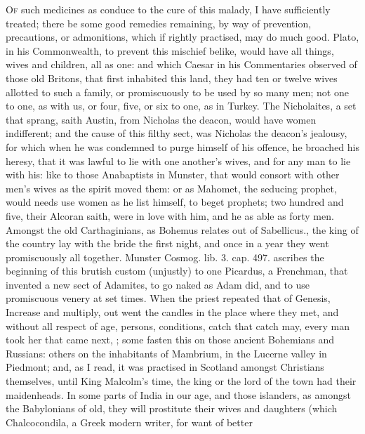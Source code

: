 \lettrine{O}{f} such medicines as conduce to the cure of this malady, I have
sufficiently treated; there be some good remedies remaining, by way of
prevention, precautions, or admonitions, which if rightly practised,
may do much good. Plato, in his Commonwealth, to prevent this mischief
belike, would have all things, wives and children, all as one: and
which Caesar in his Commentaries observed of those old Britons, that
first inhabited this land, they had ten or twelve wives allotted to
such a family, or promiscuously to be used by so many men; not one to
one, as with us, or four, five, or six to one, as in Turkey. The
Nicholaites, a set that sprang, saith Austin, from Nicholas the
deacon, would have women indifferent; and the cause of this filthy
sect, was Nicholas the deacon's jealousy, for which when he was
condemned to purge himself of his offence, he broached his heresy, that
it was lawful to lie with one another's wives, and for any man to lie
with his: like to those Anabaptists in Munster, that would
consort with other men's wives as the spirit moved them: or as
Mahomet, the seducing prophet, would needs use women as he list
himself, to beget prophets; two hundred and five, their Alcoran saith,
were in love with him, and he as able as forty men. Amongst the
old Carthaginians, as Bohemus relates out of Sabellicus., the
king of the country lay with the bride the first night, and once in a
year they went promiscuously all together. Munster Cosmog. lib. 3. cap.
497. ascribes the beginning of this brutish custom (unjustly) to one
Picardus, a Frenchman, that invented a new sect of Adamites, to go
naked as Adam did, and to use promiscuous venery at set times. When the
priest repeated that of Genesis, Increase and multiply, out went
the candles in the place where they met, and without all respect of
age, persons, conditions, catch that catch may, every man took her that
came next, \etc{}; some fasten this on those ancient Bohemians and
Russians: others on the inhabitants of Mambrium, in the Lucerne
valley in Piedmont; and, as I read, it was practised in Scotland
amongst Christians themselves, until King Malcolm's time, the king or
the lord of the town had their maidenheads. In some parts of
India in our age, and those
islanders, as amongst the Babylonians
of old, they will prostitute their wives and daughters
(which Chalcocondila, a Greek modern writer, for want of better
